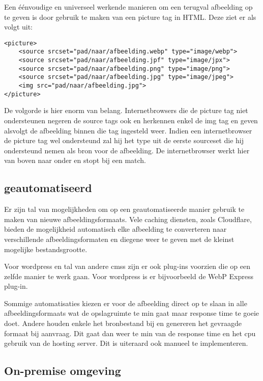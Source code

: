 Een éénvoudige en universeel werkende manieren om een terugval afbeelding op te geven is door gebruik te maken van een picture tag in HTML. Deze ziet er als volgt uit:

\begin{lstlisting}[style=htmlcssjs]
<picture>
	<source srcset="pad/naar/afbeelding.webp" type="image/webp">
	<source srcset="pad/naar/afbeelding.jpf" type="image/jpx">
	<source srcset="pad/naar/afbeelding.png" type="image/png"> 
	<source srcset="pad/naar/afbeelding.jpg" type="image/jpeg"> 
	<img src="pad/naar/afbeelding.jpg">
</picture>
\end{lstlisting}

De volgorde is hier enorm van belang. Internetbrowsers die de picture tag niet ondersteunen negeren de source tags ook en herkennen enkel de img tag en geven alsvolgt de afbeelding binnen die tag ingesteld weer. Indien een internetbrowser de picture tag wel ondersteund zal hij het type uit de eerste sourceset die hij ondersteund nemen als bron voor de afbeelding. De internetbrowser werkt hier van boven naar onder en stopt bij een match.

\subsection{geautomatiseerd}
\label{sec:afbeeldingscompressie-implementatie-web-automated}

Er zijn tal van mogelijkheden om op een geautomatiseerde manier gebruik te maken van nieuwe \glspl{afbeeldingsformaat}. Vele caching diensten, zoals Cloudflare, bieden de mogelijkheid automatisch elke afbeelding te converteren naar verschillende afbeeldingsformaten en diegene weer te geven met de kleinst mogelijke bestandsgrootte. 

Voor \gls{wordpress} en tal van andere \glspl{cms} zijn er ook \glspl{plug-in} voorzien die op een zelfde manier te werk gaan. Voor \gls{wordpress} is er bijvoorbeeld de WebP Express  \gls{plug-in}.

Sommige automatisaties kiezen er voor de afbeelding direct op te slaan in alle \glspl{afbeeldingsformaat} wat de opslagruimte te min gaat maar response time te goeie doet. Andere houden enkele het bronbestand bij en genereren het gevraagde formaat bij aanvraag. Dit gaat dan weer te min van de response time en het cpu gebruik van de \gls{hosting} server. Dit is uiteraard ook manueel te implementeren.

\subsection{On-premise omgeving}
\label{sec:afbeeldingscompressie-implementatie-on-premise}

